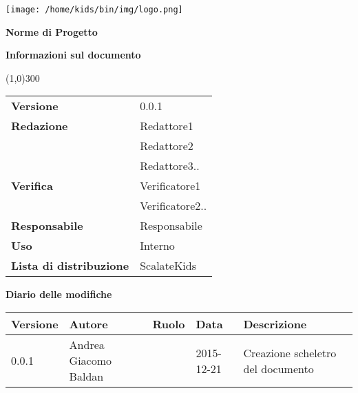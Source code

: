 \documentclass{scalatekids-article}
\begin{document}
\begin{titlepage}
  \centering
  \texttt{[image: /home/kids/bin/img/logo.png]}\par\vspace{1cm}
  \vspace{1.5cm}
         {\Huge\bfseries Norme di Progetto \par}
         \begin{center}
           \vspace{1.0cm}
                  {\large\bfseries Informazioni sul documento \par}
         \end{center}
         \vspace{-1cm}
         \begin{center}
           \line(1,0){300}
         \end{center}
         \vspace{0cm}
         \begin{tabular}[c]{l|l}
           \textbf{Versione} & 0.0.1\\
           \textbf{Redazione} & Redattore1\\ & Redattore2\\ & Redattore3..\\
           \textbf{Verifica} & Verificatore1\\ & Verificatore2..\\
           \textbf{Responsabile} & Responsabile\\
           \textbf{Uso} & Interno\\
           \textbf{Lista di distribuzione} & ScalateKids
         \end{tabular}
\end{titlepage}
\clearpage
\setcounter{page}{1}
\begin{flushleft}
  \vspace{0cm}
         {\large\bfseries Diario delle modifiche \par}
\end{flushleft}
\vspace{0cm}
\begin{center}
  \begin{tabular}{| l | l | l | l | l |}
    \hline
    Versione & Autore & Ruolo & Data & Descrizione \\
    \hline
    0.0.1 & Andrea Giacomo Baldan & & 2015-12-21 & Creazione scheletro del documento\\
    \hline
  \end{tabular}
\end{center}
\tableofcontents
\end{document}
